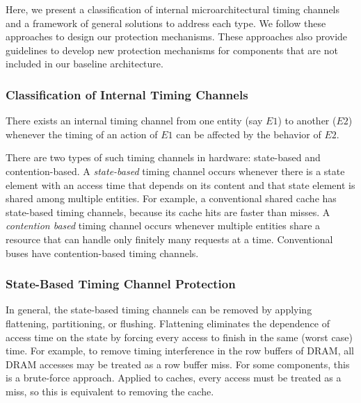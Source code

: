 Here, we present a classification of internal microarchitectural timing channels 
and a framework of general solutions to address each type.
We follow these approaches to design our
protection mechanisms. These approaches also provide guidelines to
develop new protection mechanisms for components that are not included in
our baseline architecture.

\subsubsection{Classification of Internal Timing Channels}

There exists an internal timing channel from one entity (say $E1$)
to another ($E2$) whenever the timing of an action of $E1$ can be affected 
by the behavior of $E2$.

There are two types of such timing channels in hardware: state-based
and contention-based.
A \emph{state-based} timing channel occurs whenever there is a state element 
with an access time that depends on its content and that state element is 
shared among multiple entities.
For example, a conventional shared cache has state-based timing channels, because 
its cache hits are faster than misses.
A \emph{contention based} timing channel occurs whenever multiple entities 
share a resource that can handle only finitely many requests at a time.
Conventional buses have contention-based timing channels.

\subsubsection{State-Based Timing Channel Protection}

In general, the state-based 
timing channels can be removed by applying flattening, partitioning, or 
flushing.
Flattening eliminates the dependence of access time on the state by forcing 
every access to finish in the same (worst case) time. For example, to remove timing 
interference in the row buffers of DRAM, all DRAM accesses may be treated as 
a row buffer miss.
For some components, this is a 
brute-force approach. Applied to caches, every access must be treated as a 
miss, so this is equivalent to removing the cache. 

